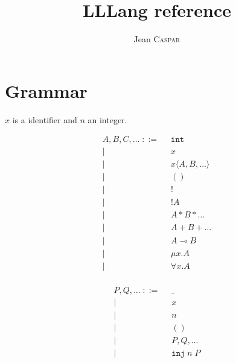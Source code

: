\documentclass{scrartcl}
\title{LLLang reference}
\author{Jean \textsc{Caspar}}
\begin{document}
\maketitle

\tableofcontents

\newpage

\section{Grammar}

$x$ is a identifier and $n$ an integer.

\hspace{-2cm}
\begin{minipage}[t]{1cm}
  \begin{align*}
    A, B, C, \dots \; ::= \;\;
      & \mathtt{int}                  \\
    | & x                             \\
    | & x \langle A, B, \dots \rangle \\
    | & ()                            \\
    | & !                             \\
    | & !A                            \\
    | & A * B * \dots                 \\
    | & A + B + \dots                 \\
    | & A \multimap B                 \\
    | & \mu x. A                      \\
    | & \forall x. A                  \\
  \end{align*}
\end{minipage}
\begin{minipage}[t]{3cm}
  \begin{align*}
    P, Q, \dots \; ::= \;\;
      & \_                 \\
    | & x                  \\
    | & n                  \\
    | & ()                 \\
    | & P, Q, \dots        \\
    | & \mathtt{inj}\;n\;P \\
  \end{align*}
\end{minipage}
\end{document}
